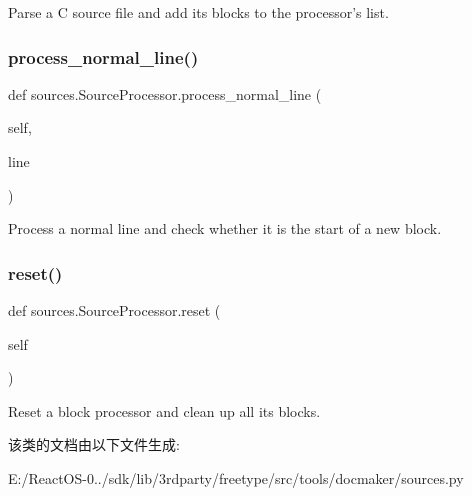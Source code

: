 \begin{DoxyVerb}Parse a C source file and add its blocks to the processor's
   list.\end{DoxyVerb}
 \mbox{\label{classsources_1_1_source_processor_a2b1c60d8bc9d94bb958e04019baafea3}} 
\subsubsection{\texorpdfstring{process\+\_\+normal\+\_\+line()}{process\_normal\_line()}}
{\footnotesize\ttfamily def sources.\+Source\+Processor.\+process\+\_\+normal\+\_\+line (\begin{DoxyParamCaption}\item[{}]{self,  }\item[{}]{line }\end{DoxyParamCaption})}

\begin{DoxyVerb}Process a normal line and check whether it is the start of a new
   block.\end{DoxyVerb}
 \mbox{\label{classsources_1_1_source_processor_a367b849e7abce1219f2c14a9c8fda0ca}} 
\subsubsection{\texorpdfstring{reset()}{reset()}}
{\footnotesize\ttfamily def sources.\+Source\+Processor.\+reset (\begin{DoxyParamCaption}\item[{}]{self }\end{DoxyParamCaption})}

\begin{DoxyVerb}Reset a block processor and clean up all its blocks.\end{DoxyVerb}
 

该类的文档由以下文件生成\+:\begin{DoxyCompactItemize}
\item 
E\+:/\+React\+O\+S-\/0../sdk/lib/3rdparty/freetype/src/tools/docmaker/sources.\+py\end{DoxyCompactItemize}
